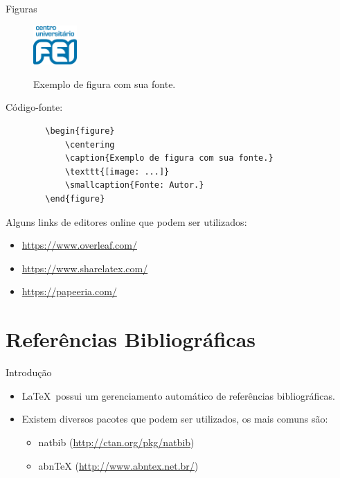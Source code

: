 \documentclass{beamer}
\begin{document}
\begin{frame}[fragile]{Figuras}
    \begin{figure}
        \centering
        \caption{Exemplo de figura com sua fonte.}
        \includegraphics[height=1.5cm]{logo_fei}\\
        \label{fig:exemplo}
    \end{figure}
    Código-fonte:
    \begin{verbatim}
        \begin{figure}
            \centering
            \caption{Exemplo de figura com sua fonte.}
            \texttt{[image: ...]}
            \smallcaption{Fonte: Autor.}
        \end{figure}
    \end{verbatim}
\end{frame}


\begin{frame}
    Alguns links de editores online que podem ser utilizados:
    \begin{itemize}
        \item  \url{https://www.overleaf.com/}
        \item  \url{https://www.sharelatex.com/}
        \item  \url{https://papeeria.com/}
    \end{itemize}
\end{frame}


\section{Referências Bibliográficas}

\begin{frame}{Introdução}
    \begin{itemize}
        \item \LaTeX~possui um gerenciamento automático de referências bibliográficas.
        \item Existem diversos pacotes que podem ser utilizados, os mais comuns são:
        \begin{itemize}
            \item natbib (\url{http://ctan.org/pkg/natbib})
            \item abnTeX (\url{http://www.abntex.net.br/})
        \end{itemize}
    \end{itemize}
\end{frame}
\end{document}
